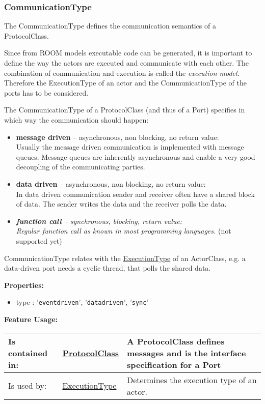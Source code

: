 	\subsubsection{CommunicationType}
		\hypertarget{ref:CommunicationType}{}
		
		The CommunicationType defines the communication semantics of a ProtocolClass.
		
		Since from ROOM models executable code can be generated, it is important to define the way the actors are 
		executed and communicate with each other. The combination of communication and execution is called the 
		\emph{execution model}. Therefore the ExecutionType of an actor and the CommunicationType of the ports has to be considered.
		
		The CommunicationType of a ProtocolClass (and thus of a Port) specifies in which way the communication should happen:
		
		\begin{itemize}
		\item \textbf{message driven} -- asynchronous, non blocking, no return value:\\
		Usually the message driven communication is implemented with message queues. Message queues are inherently asynchronous and enable a very good decoupling of the communicating parties.
		\item \textbf{data driven} -- asynchronous, non blocking, no return value:\\
		In data driven communication sender and receiver often have a shared block of data. The sender writes the data and the receiver polls the data.
		\item \textit{\textbf{function call} -- synchronous, blocking, return value:\\
		Regular function call as known in most programming languages.} (not supported yet)
		\end{itemize}
		
		CommunicationType relates with the \hyperlink{ref:ExecutionType}{ExecutionType} of an ActorClass, e.g. a data-driven port needs a cyclic thread, that polls the shared data.
		
		\textbf{Properties:}
		\begin{itemize}
		\item type : '\verb|eventdriven|', '\verb|datadriven|', '\verb|sync|'
		\end{itemize}
		
		
		\begingroup
		\textbf{Feature Usage:}
		\renewcommand{\arraystretch}{1.8} %
		\begin{longtable}{l|l p{}}
			\hline
		Is contained in: & \tabitem \hyperlink{ref:ProtocolClass}{ProtocolClass}  & A ProtocolClass defines messages and is the interface specification for a Port\\
		\hline
		Is used by: & \tabitem \hyperlink{ref:ExecutionType}{ExecutionType}  & Determines the execution type of an actor.\\
		\hline
		\end{longtable}
		\endgroup
		
